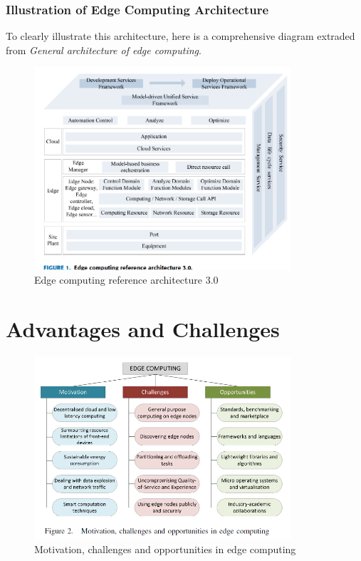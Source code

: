 \documentclass[runningheads]{llncs}
\begin{document}
\subsubsection{Illustration of Edge Computing Architecture}
To clearly illustrate this architecture, here is a comprehensive diagram extraded from \textit{General architecture of edge computing}.

\begin{figure}[ht]
    \centering
    \includegraphics[width=0.85\textwidth]{IMG/6.png}
    \caption{Edge computing reference architecture 3.0}
    \label{fig:edge_reference_architecture}
    \end{figure}
\FloatBarrier



\section{Advantages and Challenges}

\begin{figure}[h!]
    \centering
    \includegraphics[width=0.85\textwidth]{IMG/10.png}
    \caption{Motivation, challenges and opportunities in edge computing}
    \label{fig:motivation_challenges_opportunities}
    \end{figure}
\FloatBarrier
\end{document}
